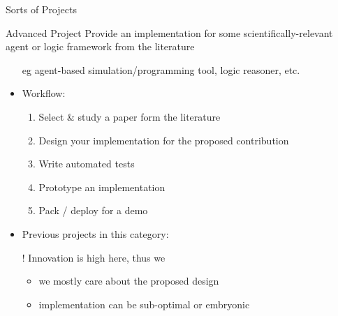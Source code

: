 \documentclass[presentation]{beamer}\mode<presentation>{\usetheme{AMSBolognaFC}}
\begin{document}
\begin{frame}[c, allowframebreaks]{Sorts of Projects}
    \begin{block}{Advanced \courseAcronym{} Project}
        Provide an implementation for some \alert{scientifically-relevant} agent or logic framework \alert{from the literature}
        \begin{itemize}
            \item[eg] agent-based simulation/programming tool, logic reasoner, etc. 
            \item Workflow:
            \begin{enumerate}
				\item Select \& study a paper form the literature
				\item Design your implementation for the proposed contribution
				\item Write \alert{automated} tests
				\item Prototype an implementation
				\item Pack / deploy for a demo
			\end{enumerate}
            \item Previous projects in this category: 
            \item[!] Innovation is high here, thus we
            \begin{itemize}
                \item we mostly care about the proposed design
                \item implementation can be sub-optimal or embryonic
            \end{itemize}
        \end{itemize}
    \end{block}


\end{frame}
\end{document}

